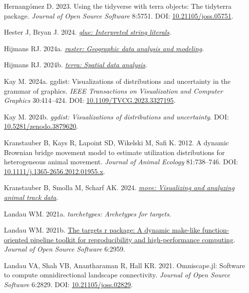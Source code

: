 \documentclass[10pt,a4paper]{article}
\newlength{\cslhangindent}
\newenvironment{CSLReferences}[2] %
 {\begin{list}{}{%
  \setlength{\itemindent}{0pt}
  \setlength{\leftmargin}{0pt}
  \setlength{\parsep}{0pt}
  \ifodd #1
   \setlength{\leftmargin}{\cslhangindent}
   \setlength{\itemindent}{-1\cslhangindent}
  \fi
  \setlength{\itemsep}{#2\baselineskip}}}
 {\end{list}}
\begin{document}
\begin{CSLReferences}{1}{0}
Hernangómez D. 2023. Using the {tidyverse} with {terra} objects: The {tidyterra} package. \emph{Journal of Open Source Software} 8:5751. DOI: \href{https://doi.org/10.21105/joss.05751}{10.21105/joss.05751}.

Hester J, Bryan J. 2024. \emph{\href{https://CRAN.R-project.org/package=glue}{{glue}: Interpreted string literals}}.

Hijmans RJ. 2024a. \emph{\href{https://CRAN.R-project.org/package=raster}{{raster}: Geographic data analysis and modeling}}.

Hijmans RJ. 2024b. \emph{\href{https://CRAN.R-project.org/package=terra}{{terra}: Spatial data analysis}}.

Kay M. 2024a. {ggdist}: Visualizations of distributions and uncertainty in the grammar of graphics. \emph{IEEE Transactions on Visualization and Computer Graphics} 30:414--424. DOI: \href{https://doi.org/10.1109/TVCG.2023.3327195}{10.1109/TVCG.2023.3327195}.

Kay M. 2024b. \emph{{ggdist}: Visualizations of distributions and uncertainty}. DOI: \href{https://doi.org/10.5281/zenodo.3879620}{10.5281/zenodo.3879620}.

Kranstauber B, Kays R, Lapoint SD, Wikelski M, Safi K. 2012. A dynamic {Brownian} bridge movement model to estimate utilization distributions for heterogeneous animal movement. \emph{Journal of Animal Ecology} 81:738--746. DOI: \href{https://doi.org/10.1111/j.1365-2656.2012.01955.x}{10.1111/j.1365-2656.2012.01955.x}.

Kranstauber B, Smolla M, Scharf AK. 2024. \emph{\href{https://CRAN.R-project.org/package=move}{{move}: Visualizing and analyzing animal track data}}.

Landau WM. 2021a. \emph{{tarchetypes}: Archetypes for targets}.

Landau WM. 2021b. \href{https://doi.org/10.21105/joss.02959}{The targets r package: A dynamic make-like function-oriented pipeline toolkit for reproducibility and high-performance computing}. \emph{Journal of Open Source Software} 6:2959.

Landau VA, Shah VB, Anantharaman R, Hall KR. 2021. Omniscape.jl: {Software} to compute omnidirectional landscape connectivity. \emph{Journal of Open Source Software} 6:2829. DOI: \href{https://doi.org/10.21105/joss.02829}{10.21105/joss.02829}.


\end{CSLReferences}
\end{document}
